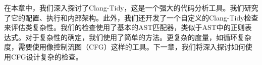 在本章中，我们深入探讨了Clang-Tidy，这是一个强大的代码分析工具。我们研究了它的配置、执行和内部架构。此外，我们还开发了一个自定义的Clang-Tidy检查来评估类复杂性。我们的检查使用了基本的AST匹配器，类似于AST中的正则表达式。对于复杂性的确定，我们使用了简单的方法。更复杂的度量，如循环复杂度，需要使用像控制流图（CFG）这样的工具。下一章，我们将深入探讨如何使用CFG设计复杂的检查。

